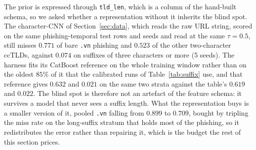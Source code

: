 The prior is expressed through \texttt{tld\_len}, which is a column of the hand-built schema, so we asked whether a representation without it inherits the blind spot. The character-CNN of Section~\ref{sec:data}, which reads the raw URL string, scored on the same phishing-temporal test rows and seeds and read at the same $\tau = 0.5$, still misses $0.771$ of bare \texttt{.vn} phishing and $0.523$ of the other two-character ccTLDs, against $0.074$ on suffixes of three characters or more (5 seeds). The harness fits its CatBoost reference on the whole training window rather than on the oldest $85\%$ of it that the calibrated runs of Table~\ref{tab:suffix} use, and that reference gives $0.632$ and $0.021$ on the same two strata against the table's $0.619$ and $0.022$. The blind spot is therefore not an artefact of the feature schema: it survives a model that never sees a suffix length. What the representation buys is a smaller version of it, pooled \texttt{.vn} falling from $0.899$ to $0.709$, bought by tripling the miss rate on the long-suffix stratum that holds most of the phishing, so it redistributes the error rather than repairing it, which is the budget the rest of this section prices.%
